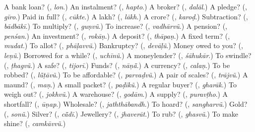 \begin{tcolorbox}[breakable,colback=teal!4,colframe=teal!35!black,title={Before you move on}]
A bank loan? (\textbf{}, \emph{lon}.) An instalment? (\textbf{}, \emph{hapto}.) A broker? (\textbf{}, \emph{dalāl}.) A pledge? (\textbf{}, \emph{gīro}.) Paid in full? (\textbf{}, \emph{cūkte}.) A lakh? (\textbf{}, \emph{lākh}.) A crore? (\textbf{}, \emph{karoḍ}.) Subtraction? (\textbf{}, \emph{bādbākī}.) To multiply? (\textbf{}, \emph{guṇvũ}.) To increase? (\textbf{}, \emph{vadhārvũ}.) A pension? (\textbf{}, \emph{penśan}.) An investment? (\textbf{}, \emph{rokāṇ}.) A deposit? (\textbf{}, \emph{thāpaṇ}.) A fixed term? (\textbf{}, \emph{mudat}.) To allot? (\textbf{}, \emph{phāḷavvũ}.) Bankruptcy? (\textbf{}, \emph{devāḷũ}.) Money owed to you? (\textbf{}, \emph{leṇũ}.) Borrowed for a while? (\textbf{}, \emph{uchīnũ}.) A moneylender? (\textbf{}, \emph{śāhukār}.) To swindle? (\textbf{}, \emph{ṭhagvũ}.) A safe? (\textbf{}, \emph{tijorī}.) Funds? (\textbf{}, \emph{nāṇā̃}.) A currency? (\textbf{}, \emph{calaṇ}.) To be robbed? (\textbf{}, \emph{lū̃ṭāvũ}.) To be affordable? (\textbf{}, \emph{parvaḍvũ}.) A pair of scales? (\textbf{}, \emph{trājvũ}.) A maund? (\textbf{}, \emph{maṇ}.) A small packet? (\textbf{}, \emph{paḍīkũ}.) A regular buyer? (\textbf{}, \emph{gharāk}.) To weigh out? (\textbf{}, \emph{jokhvũ}.) A warehouse? (\textbf{}, \emph{godām}.) A supply? (\textbf{}, \emph{puravṭho}.) A shortfall? (\textbf{}, \emph{ūṇap}.) Wholesale? (\textbf{}, \emph{jaththābandh}.) To hoard? (\textbf{}, \emph{sangharvũ}.) Gold? (\textbf{}, \emph{sonũ}.) Silver? (\textbf{}, \emph{cā̃dī}.) Jewellery? (\textbf{}, \emph{jhaverāt}.) To rub? (\textbf{}, \emph{ghasvũ}.) To make shine? (\textbf{}, \emph{camkāvvũ}.)
\end{tcolorbox}
